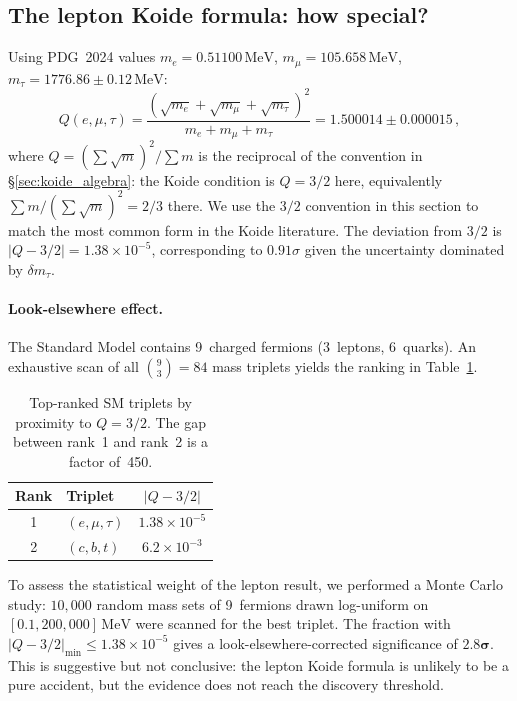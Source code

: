 \documentclass[12pt,a4paper]{article}
\newcommand{\MeV}{\,\text{MeV}}
\begin{document}
\subsection{The lepton Koide formula: how special?}
Using PDG~2024 values $m_e = 0.51100\MeV$, $m_\mu = 105.658\MeV$,
$m_\tau = 1776.86 \pm 0.12\MeV$:
\begin{equation}
Q(e,\mu,\tau) = \frac{(\sqrt{m_e} + \sqrt{m_\mu} + \sqrt{m_\tau})^2}
{m_e + m_\mu + m_\tau} = 1.500014 \pm 0.000015\,,
\end{equation}
where $Q = (\sum\sqrt{m})^2 / \sum m$ is the reciprocal of the
convention in \S\ref{sec:koide_algebra}: the Koide condition is
$Q = 3/2$ here, equivalently $\sum m / (\sum\sqrt{m})^2 = 2/3$
there. We use the $3/2$ convention in this section to match
the most common form in the Koide literature.
The deviation from $3/2$ is $|Q - 3/2| = 1.38 \times 10^{-5}$,
corresponding to $0.91\sigma$ given the uncertainty dominated by
$\delta m_\tau$.

\paragraph{Look-elsewhere effect.}
The Standard Model contains 9~charged fermions (3~leptons, 6~quarks).
An exhaustive scan of all $\binom{9}{3} = 84$ mass triplets yields
the ranking in Table~\ref{tab:koide_scan}.

\begin{table}[ht]
\centering
\caption{Top-ranked SM triplets by proximity to $Q = 3/2$. The gap
between rank~1 and rank~2 is a factor of~450.}
\label{tab:koide_scan}
\begin{tabular}{clc}
\toprule
Rank & Triplet & $|Q - 3/2|$ \\
\midrule
1 & $(e, \mu, \tau)$ & $1.38 \times 10^{-5}$ \\
2 & $(c, b, t)$ & $6.2 \times 10^{-3}$ \\
\bottomrule
\end{tabular}
\end{table}

To assess the statistical weight of the lepton result, we performed a
Monte Carlo study: $10{,}000$ random mass sets of 9~fermions drawn
log-uniform on $[0.1, 200{,}000]\MeV$ were scanned for the best
triplet. The fraction with $|Q - 3/2|_{\min} \leq 1.38 \times 10^{-5}$
gives a look-elsewhere-corrected significance of $\mathbf{2.8\sigma}$.
This is suggestive but not conclusive: the lepton Koide formula is
unlikely to be a pure accident, but the evidence does not reach the
discovery threshold.
\end{document}
